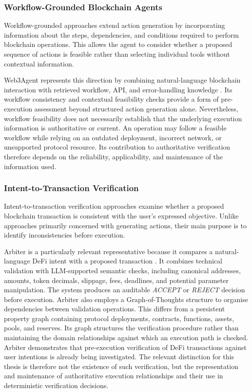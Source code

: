 \subsubsection{Workflow-Grounded Blockchain Agents}

Workflow-grounded approaches extend action generation by
incorporating information about the steps, dependencies,
and conditions required to perform blockchain operations.
This allows the agent to consider whether a proposed
sequence of actions is feasible rather than selecting
individual tools without contextual information. 

Web3Agent represents this direction by combining
natural-language blockchain interaction with retrieved
workflow, API, and error-handling knowledge
\cite{TODO_Web3Agent}. Its workflow consistency and
contextual feasibility checks provide a form of
pre-execution assessment beyond structured action
generation alone. Nevertheless, workflow feasibility does not necessarily
establish that the underlying execution information is
authoritative or current. An operation may follow a
feasible workflow while relying on an outdated deployment,
incorrect network, or unsupported protocol resource.
Its contribution to authoritative verification therefore
depends on the reliability, applicability, and maintenance
of the information used.

\subsubsection{Intent-to-Transaction Verification}

Intent-to-transaction verification approaches examine whether
a proposed blockchain transaction is consistent with the
user's expressed objective. Unlike approaches primarily
concerned with generating actions, their main purpose is
to identify inconsistencies before execution.

Arbiter is a particularly relevant representative because
it compares a natural-language DeFi intent with a proposed
transaction \cite{TODO_Arbiter2026}. It combines technical
validation with LLM-supported semantic checks, including
canonical addresses, amounts, token decimals, slippage,
fees, deadlines, and potential parameter manipulation.
The system produces an auditable \textit{ACCEPT} or
\textit{REJECT} decision before execution. Arbiter also employs a Graph-of-Thoughts structure to
organise dependencies between validation operations.
This differs from a persistent property graph containing
protocol deployments, contracts, functions, assets,
pools, and reserves. Its graph structures the verification
procedure rather than maintaining the domain relationships
against which an execution path is checked. Arbiter demonstrates that pre-execution verification of
DeFi transactions against user intentions is already
being investigated. The relevant distinction for this
thesis is therefore not the existence of such verification,
but the representation and maintenance of authoritative
execution relationships and their use in deterministic
verification decisions.

